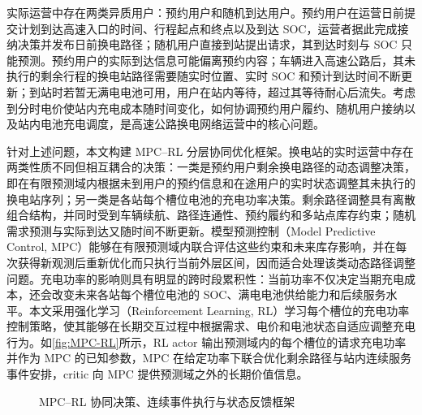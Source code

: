 \documentclass[12pt,a4paper,UTF8]{ctexart}
\begin{document}
实际运营中存在两类异质用户：预约用户和随机到达用户。预约用户在运营日前提交计划到达高速入口的时间、行程起点和终点以及到达 SOC，运营者据此完成接纳决策并发布日前换电路径；随机用户直接到站提出请求，其到达时刻与 SOC 只能预测。预约用户的实际到达信息可能偏离预约内容；车辆进入高速公路后，其未执行的剩余行程的换电站路径需要随实时位置、实时 SOC 和预计到达时间不断更新；到站时若暂无满电电池可用，用户在站内等待，超过其等待耐心后流失。考虑到分时电价使站内充电成本随时间变化，如何协调预约用户履约、随机用户接纳以及站内电池充电调度，是高速公路换电网络运营中的核心问题。

针对上述问题，本文构建 MPC--RL 分层协同优化框架。换电站的实时运营中存在两类性质不同但相互耦合的决策：一类是预约用户剩余换电路径的动态调整决策，即在有限预测域内根据未到用户的预约信息和在途用户的实时状态调整其未执行的换电站序列；另一类是各站每个槽位电池的充电功率决策。剩余路径调整具有离散组合结构，并同时受到车辆续航、路径连通性、预约履约和多站点库存约束；随机需求预测与实际到达又随时间不断更新。模型预测控制（Model Predictive Control, MPC）能够在有限预测域内联合评估这些约束和未来库存影响，并在每次获得新观测后重新优化而只执行当前外层区间，因而适合处理该类动态路径调整问题。充电功率的影响则具有明显的跨时段累积性：当前功率不仅决定当期充电成本，还会改变未来各站每个槽位电池的 SOC、满电电池供给能力和后续服务水平。本文采用强化学习（Reinforcement Learning, RL）学习每个槽位的充电功率控制策略，使其能够在长期交互过程中根据需求、电价和电池状态自适应调整充电行为。如\autoref{fig:MPC-RL}所示，RL actor 输出预测域内的每个槽位的请求充电功率并作为 MPC 的已知参数，MPC 在给定功率下联合优化剩余路径与站内连续服务事件安排，critic 向 MPC 提供预测域之外的长期价值信息。

\begin{figure}[!htbp]
  \centering
  \caption{MPC--RL 协同决策、连续事件执行与状态反馈框架}
  \label{fig:MPC-RL}
\end{figure}
\end{document}
